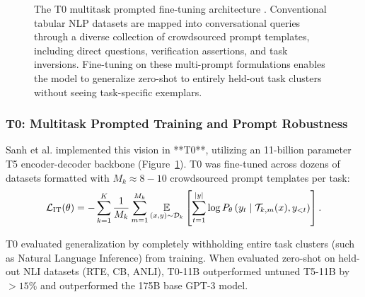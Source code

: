\documentclass[../../main.tex]{subfiles}
\begin{document}
\begin{figure}[t]
\caption{The T0 multitask prompted fine-tuning architecture \citep{sanh2022}. Conventional tabular NLP datasets are mapped into conversational queries through a diverse collection of crowdsourced prompt templates, including direct questions, verification assertions, and task inversions. Fine-tuning on these multi-prompt formulations enables the model to generalize zero-shot to entirely held-out task clusters without seeing task-specific exemplars.}
\label{fig:t0_multitask_workflow}
\end{figure}

\subsubsection{T0: Multitask Prompted Training and Prompt Robustness}
Sanh et al. \citep{sanh2022} implemented this vision in **T0**, utilizing an 11-billion parameter T5 encoder-decoder backbone (Figure~\ref{fig:t0_multitask_workflow}). T0 was fine-tuned across dozens of datasets formatted with $M_k \approx 8-10$ crowdsourced prompt templates per task:
\begin{equation}
\label{eq:multitask_instruction_loss}
\mathcal{L}_{\text{IT}}(\theta) = -\sum_{k=1}^K \frac{1}{M_k} \sum_{m=1}^{M_k} \operatorname*{\mathbb{E}}_{(x, y) \sim \mathcal{D}_k} \left[ \sum_{t=1}^{|y|} \log P_\theta\left(y_t \;\middle|\; \mathcal{T}_{k, m}(x), y_{<t}\right) \right].
\end{equation}

T0 evaluated generalization by completely withholding entire task clusters (such as Natural Language Inference) from training. When evaluated zero-shot on held-out NLI datasets (RTE, CB, ANLI), T0-11B outperformed untuned T5-11B by $>15\%$ and outperformed the 175B base GPT-3 model.
\end{document}
